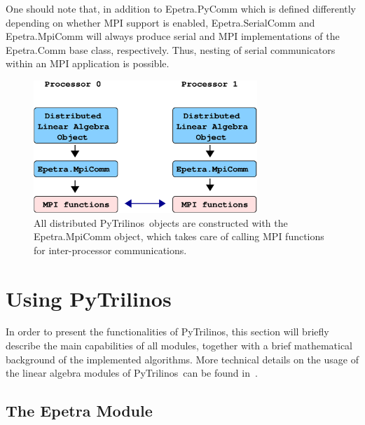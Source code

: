 \documentclass[acmtocl]{acmtrans2m}
\newcommand{\PyTrilinos}{{PyTrilinos}}
\begin{document}
One should note that, in addition to Epetra.PyComm which is defined
differently depending on whether MPI support is enabled,
Epetra.SerialComm and Epetra.MpiComm will always produce serial and
MPI implementations of the Epetra.Comm base class, respectively.
Thus, nesting of serial communicators within an MPI application is
possible.

\begin{figure}
  \begin{center}
    \includegraphics[height=5cm]{distributed_object.eps}
    \caption{All distributed \PyTrilinos\ objects are constructed with
      the Epetra.MpiComm object, which takes care of calling MPI
      functions for inter-processor communications.}
    \label{fig:distributed}
  \end{center}
\end{figure}

\section{Using \PyTrilinos}
\label{sec:using}

In order to present the functionalities of \PyTrilinos, this section
will briefly describe the main capabilities of all modules, together
with a brief mathematical background of the implemented algorithms.
More technical details on the usage of the linear algebra modules of
\PyTrilinos\ can be found in~\cite{pytrilinos-la-guide}.

\subsection{The Epetra Module}
\label{subsec:epetra}
\end{document}
